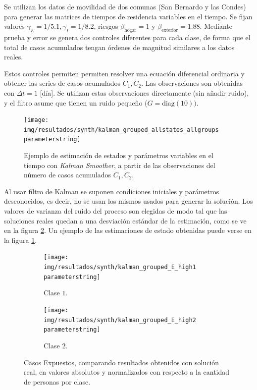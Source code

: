 Se utilizan los datos de movilidad de dos comunas (San Bernardo y las Condes) para generar las matrices de tiempos de residencia variables en el tiempo. Se fijan valores \(\gamma_E = 1/5.1, \gamma_I = 1/8.2\), riesgos \(\beta_{\text{hogar}} = 1\) y \(\beta_{\text{exterior}} = 1.88\). Mediante prueba y error se genera dos controles diferentes para cada clase, de forma que el total de casos acumulados tengan órdenes de magnitud similares a los datos reales.

Estos controles permiten permiten resolver una ecuación diferencial ordinaria y obtener las series de casos acumulados \(C_1, C_2\). Las observaciones son obtenidas con \(\Delta t = 1\) [día]. Se utilizan estas observaciones directamente (sin añadir ruido), y el filtro asume que tienen un ruido pequeño (\(G = \text{diag}(10))\).




\begin{figure}[!h]
\centering
\texttt{[image: img/resultados/synth/kalman\_grouped\_allstates\_allgroups\\parameterstring]}
\caption{Ejemplo de estimación de estados y parámetros variables en el tiempo con \textit{Kalman Smoother}, a partir de las observaciones del número de casos acumulados \(C_1, C_2\).}
\label{synth-all-nohigh}
\end{figure}

Al usar filtro de Kalman se suponen condiciones iniciales y parámetros desconocidos, es decir, no se usan los mismos usados para generar la solución. Los valores de varianza del ruido del proceso son elegidas de modo tal que las soluciones reales quedan a una desviación estándar de la estimación, como se ve en la figura \ref{synth-e-comp-high}. Un ejemplo de las estimaciones de estado obtenidas puede verse en la figura \ref{synth-all-nohigh}.




\begin{figure}[!h]
     \centering
     \begin{subfigure}[b]{.47\textwidth}
         \centering
         \texttt{[image: img/resultados/synth/kalman\_grouped\_E\_high1\\parameterstring]}
         \caption{Clase \(1\).}
     \end{subfigure}
     \hfill
     \begin{subfigure}[b]{.47\textwidth}
         \centering
         \texttt{[image: img/resultados/synth/kalman\_grouped\_E\_high2\\parameterstring]}
         \caption{Clase \(2\).}
     \end{subfigure}
        \caption{Casos Expuestos, comparando resultados obtenidos con solución real, en valores absolutos y normalizados con respecto a la cantidad de personas por clase.}
        \label{synth-e-comp-high}
\end{figure}


